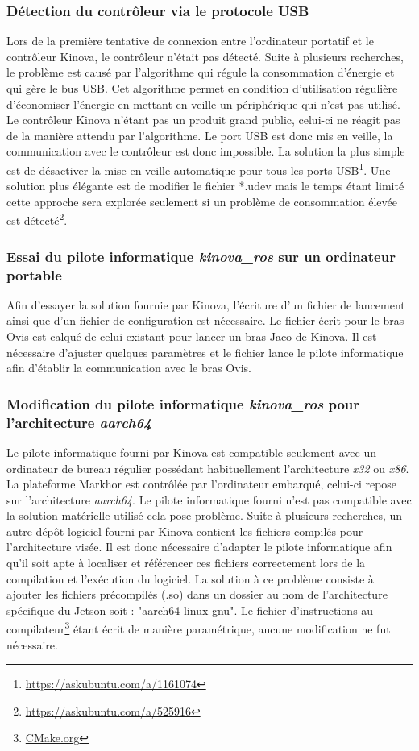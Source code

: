 \subsubsection{Détection du contrôleur via le protocole USB}
Lors de la première tentative de connexion entre l'ordinateur portatif et le contrôleur Kinova, le contrôleur n'était pas détecté. Suite à plusieurs recherches, le problème est causé par l'algorithme qui régule la consommation d'énergie et qui gère le bus USB. Cet algorithme permet en condition d'utilisation régulière d'économiser l'énergie en mettant en veille un périphérique qui n'est pas utilisé. Le contrôleur Kinova n'étant pas un produit grand public, celui-ci ne réagit pas de la manière attendu par l'algorithme. Le port USB est donc mis en veille, la communication avec le contrôleur est donc impossible. La solution la plus simple est de désactiver la mise en veille automatique pour tous les ports USB\footnote{\url{https://askubuntu.com/a/1161074}}. Une solution plus élégante est de modifier le fichier *.udev mais le temps étant limité cette approche sera explorée seulement si un problème de consommation élevée est détecté\footnote{\url{https://askubuntu.com/a/525916}}.

\subsubsection{Essai du pilote informatique \emph{kinova\_ros} sur un ordinateur portable}
Afin d'essayer la solution fournie par Kinova, l'écriture d'un  fichier de lancement ainsi que d'un fichier de configuration est nécessaire. Le fichier écrit pour le bras Ovis est calqué de celui existant pour lancer un bras Jaco de Kinova. Il est nécessaire d'ajuster quelques paramètres et le fichier lance le pilote informatique afin d'établir la communication avec le bras Ovis.

\subsubsection{Modification du pilote informatique \emph{kinova\_ros} pour l'architecture \emph{aarch64}}
Le pilote informatique fourni par Kinova est compatible seulement avec un ordinateur de bureau régulier possédant habituellement l'architecture \emph{x32} ou \emph{x86}. La plateforme Markhor est contrôlée par l'ordinateur embarqué, celui-ci repose sur l'architecture \emph{aarch64}. Le pilote informatique fourni n'est pas compatible avec la solution matérielle utilisé cela pose problème. Suite à plusieurs recherches, un autre dépôt logiciel fourni par Kinova contient les fichiers compilés pour l'architecture visée. Il est donc nécessaire d'adapter le pilote informatique afin qu'il soit apte à localiser et référencer ces fichiers correctement lors de la compilation et l'exécution du logiciel. La solution à ce problème consiste à ajouter les fichiers précompilés (.so) dans un dossier au nom de l'architecture spécifique du Jetson soit : "aarch64-linux-gnu". Le fichier d'instructions au compilateur\footnote{\href{https://cmake.org}{CMake.org}} étant écrit de manière paramétrique, aucune modification ne fut nécessaire.

